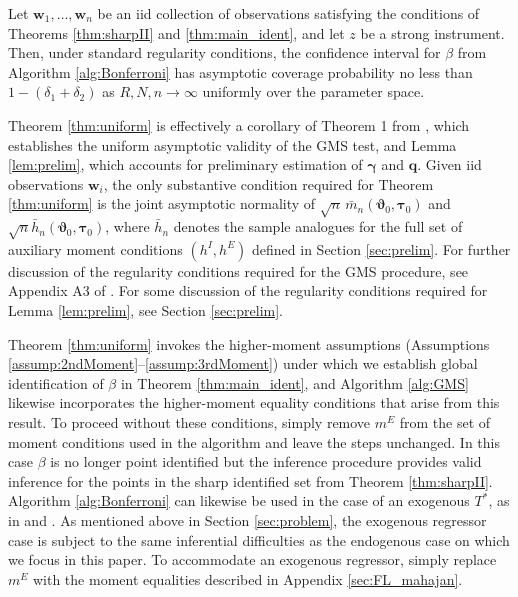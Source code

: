 \begin{thm}
  Let $\mathbf{w}_1, \hdots, \mathbf{w}_n$ be an iid collection of observations satisfying the conditions of Theorems \ref{thm:sharpII} and \ref{thm:main_ident}, and let $z$ be a strong instrument.
  Then, under standard regularity conditions, the confidence interval for $\beta$ from Algorithm \ref{alg:Bonferroni} has asymptotic coverage probability no less than $1 - (\delta_1 + \delta_2)$ as $R,N,n\rightarrow \infty$ uniformly over the parameter space.
  \label{thm:uniform}
\end{thm}

Theorem \ref{thm:uniform} is effectively a corollary of Theorem 1 from \cite{AndrewsSoares}, which establishes the uniform asymptotic validity of the GMS test, and Lemma \ref{lem:prelim}, which accounts for preliminary estimation of $\boldsymbol{\gamma}$ and $\mathbf{q}$.
Given iid observations $\mathbf{w}_i$, the only substantive condition required for Theorem \ref{thm:uniform} is the joint asymptotic normality of $\sqrt{n} \,\bar{m}_n(\boldsymbol{\vartheta}_0, \boldsymbol{\tau}_0)$ and $\sqrt{n}\bar{h}_n(\boldsymbol{\vartheta}_0, \boldsymbol{\tau}_0)$, where $\bar{h}_n$ denotes the sample analogues for the full set of auxiliary moment conditions $(h^I, h^E)$ defined in Section \ref{sec:prelim}.
For further discussion of the regularity conditions required for the GMS procedure, see Appendix A3 of \cite{AndrewsSoares}.
For some discussion of the regularity conditions required for Lemma \ref{lem:prelim}, see Section \ref{sec:prelim}.

Theorem \ref{thm:uniform} invokes the higher-moment assumptions (Assumptions \ref{assump:2ndMoment}--\ref{assump:3rdMoment}) under which we establish global identification of $\beta$ in Theorem \ref{thm:main_ident}, and Algorithm \ref{alg:GMS} likewise incorporates the higher-moment equality conditions that arise from this result.
To proceed without these conditions, simply remove $m^E$ from the set of moment conditions used in the algorithm and leave the steps unchanged.
In this case $\beta$ is no longer point identified but the inference procedure provides valid inference for the points in the sharp identified set from Theorem \ref{thm:sharpII}.
Algorithm \ref{alg:Bonferroni} can likewise be used in the case of an exogenous $T^*$, as in \cite{Mahajan} and \cite{FL}.
As mentioned above in Section \ref{sec:problem}, the exogenous regressor case is subject to the same inferential difficulties as the endogenous case on which we focus in this paper.
To accommodate an exogenous regressor, simply replace $m^E$ with the moment equalities described in Appendix \ref{sec:FL_mahajan}.


